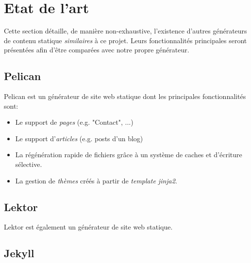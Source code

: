 \section{Etat de l'art}
	
	Cette section détaille, de manière non-exhaustive, l'existence d'autres générateurs de contenu statique \textit{similaires} à ce projet. Leurs fonctionnalités principales seront présentées afin d'être comparées avec notre propre générateur.
	
	\subsection*{Pelican}
	Pelican est un générateur de site web statique dont les principales fonctionnalités sont:
	\begin{itemize}
		\item Le support de \textit{pages} (e.g. "Contact", ...)
		\item Le support d'\textit{articles} (e.g. posts d'un blog)
		\item La régénération rapide de fichiers grâce à un système de caches et d'écriture sélective.
		\item La gestion de \textit{thèmes} créés à partir de \textit{template jinja2}.
	\end{itemize}
	
	\subsection*{Lektor}
	Lektor est également un générateur de site web statique. 
	
	\subsection*{Jekyll}